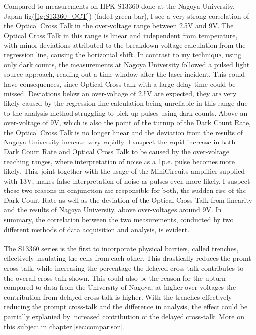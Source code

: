 \documentclass[12pt,article,type=msc,colorback,accentcolor=tud9c]{tudthesis}
\begin{document}
Compared to measurements on HPK S13360 done at the Nagoya University, Japan fig(\ref{fig:S13360_OCT}) (faded green bar), I see a very strong correlation of the Optical Cross Talk in the over-voltage range between 2.5V and 9V. The Optical Cross Talk in this range is linear and independent from temperature, with minor deviations attributed to the breakdown-voltage calculation from the regression line, causing the horizontal shift. In contrast to my technique, using only dark counts, the measurements at Nagoya University followed a pulsed light source approach, reading out a time-window after the laser incident. This could have consequences, since Optical Cross talk with a large delay time could be missed. Deviations below an over-voltage of 2.5V are expected, they are very likely caused by the regression line calculation being unreliable in this range due to the analysis method struggling to pick up pulses using dark counts. Above an over-voltage of 9V, which is also the point of the turnup of the Dark Count Rate, the Optical Cross Talk is no longer linear and the deviation from the results of Nagoya University increase very rapidly. I suspect the rapid increase in both Dark Count Rate and Optical Cross Talk to be caused by the over-voltage reaching ranges, where interpretation of noise as a 1p.e. pulse becomes more likely. This, joint together with the usage of the MiniCircuits amplifier supplied with 13V, makes false interpretation of noise as pulses even more likely. I suspect these two reasons in conjunction are responsible for both, the sudden rise of the Dark Count Rate as well as the deviation of the Optical Cross Talk from linearity and the results of Nagoya University, above over-voltages around 9V. In summary, the correlation between the two measurements, conducted by two different methods of data acquisition and analysis, is evident.\\\\

The S13360 series is the first to incorporate physical barriers, called trenches, effectively insulating the cells from each other. This drastically reduces the promt cross-talk, while increasing the percentage the delayed cross-talk contributes to the overall cross-talk shown. This could also be the reason for the upturn compared to data from the University of Nagoya, at higher over-voltages the contribution from delayed cross-talk is higher. With the trenches effectively reducing the prompt cross-talk and the difference in analysis, the effect could be partially explanied by increased contribution of the delayed cross-talk. More on this subject in chapter {\ref{sec:comparison}}.
\end{document}

